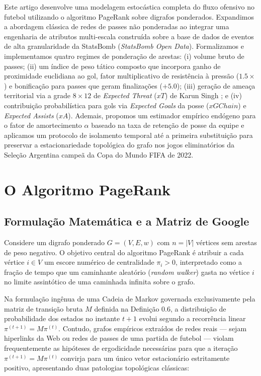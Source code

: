 \documentclass[10pt,a4paper]{article}
\theoremstyle{definition}
\theoremstyle{plain}
\theoremstyle{remark}
\begin{document}
Este artigo desenvolve uma modelagem estocástica completa do fluxo ofensivo no futebol utilizando o algoritmo PageRank sobre digrafos ponderados. Expandimos a abordagem clássica de redes de passes não ponderadas ao integrar uma engenharia de atributos multi-escala construída sobre a base de dados de eventos de alta granularidade da StatsBomb (\textit{StatsBomb Open Data}). Formalizamos e implementamos quatro regimes de ponderação de arestas: (i) volume bruto de passes; (ii) um índice de peso tático composto que incorpora ganho de proximidade euclidiana ao gol, fator multiplicativo de resistência à pressão ($1.5\times$) e bonificação para passes que geram finalizações ($+5.0$); (iii) geração de ameaça territorial via a grade $8 \times 12$ de \textit{Expected Threat} ($xT$) de Karun Singh \cite{singh2018}; e (iv) contribuição probabilística para gols via \textit{Expected Goals} da posse ($xGChain$) e \textit{Expected Assists} ($xA$). Ademais, propomos um estimador empírico endógeno para o fator de amortecimento $\alpha$ baseado na taxa de retenção de posse da equipe e aplicamos um protocolo de isolamento temporal até a primeira substituição para preservar a estacionariedade topológica do grafo nos jogos eliminatórios da Seleção Argentina campeã da Copa do Mundo FIFA de 2022.

\section{\sffamily O Algoritmo PageRank}

\subsection{\sffamily Formulação Matemática e a Matriz de Google}

Considere um digrafo ponderado $G = (V, E, w)$ com $n = |V|$ vértices sem arestas de peso negativo. O objetivo central do algoritmo PageRank é atribuir a cada vértice $i \in V$ um escore numérico de centralidade $\pi_i > 0$, interpretado como a fração de tempo que um caminhante aleatório (\textit{random walker}) gasta no vértice $i$ no limite assintótico de uma caminhada infinita sobre o grafo.

Na formulação ingênua de uma Cadeia de Markov governada exclusivamente pela matriz de transição bruta $M$ definida na Definição 0.6, a distribuição de probabilidade dos estados no instante $t+1$ evolui segundo a recorrência linear $\pi^{(t+1)} = M \pi^{(t)}$. Contudo, grafos empíricos extraídos de redes reais --- sejam hiperlinks da Web ou redes de passes de uma partida de futebol --- violam frequentemente as hipóteses de ergodicidade necessárias para que a iteração $\pi^{(t+1)} = M \pi^{(t)}$ convirja para um único vetor estacionário estritamente positivo, apresentando duas patologias topológicas clássicas:
\end{document}
